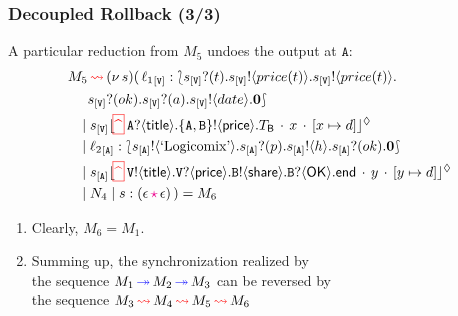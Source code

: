 \documentclass[12pt]{beamer}
\newcommand{\pS}{\ensuremath{\mathtt{V}}\xspace}
\newcommand{\epS}{\ep{s}{\mathtt{V}}}
\newcommand{\fwcolor}[1]{\textcolor{blue}{#1}}
\newcommand{\bkcolor}[1]{\textcolor{red}{#1}}
\newcommand{\sepcolor}[1]{\textcolor{magenta}{#1}}
\newcommand{\upd}[2]{[#1\mapsto #2]}
\newcommand{\sred}[1]{\textcolor{myred}{#1}}
\newcommand{\news}[1]{(\nu\, #1)}
\newcommand{\bi}{\begin{enumerate}[$\bullet$]}
\newcommand{\ei}{\end{enumerate}}
\newcommand{\queue}[1]{\lfloor #1 \rfloor}
\newcommand{\mysepp}{\,\cdot\,}
\newcommand{\codah}[4]{\coda{#1}{(#2\,\history\,#3)\!#4}}
\newcommand{\history}{\sepcolor{\mathbf{\star}}}
\newcommand{\coda}[2]{#1:#2}
\newcommand{\lend}{\mathsf{end}}
\newcommand{\gpart}[1]{\mathtt{#1}}
\newcommand{\hmoni}[4]{\ensuremath{{#1\queue{\textcolor{black}{#2}\mysepp #3\mysepp #4}^{\normark}}}}
\newcommand{\past}{\,\text{\textcolor{red}{\textbf{\textasciicircum}}}\,}
\newcommand{\mypast}{\,\sred{\framebox[3mm]{\past}\,}}
\newcommand{\conf}[2]{\lbag #2 \rbag} %
\newcommand{\ltout}[3]{\gpart{#1}!\langle#2\rangle.#3}
\newcommand{\ltinp}[3]{\gpart{#1}?\langle#2\rangle.#3}
\newcommand{\outses}{!}
\newcommand{\inpses}{?}
\newcommand{\Par}{\;|\;}
\newcommand{\emp}{\epsilon}
\newcommand{\freev}[1]{\langle #1\rangle}
\newcommand{\boundv}[1]{(#1)}
\newcommand{\shsep}{.}
\newcommand{\bout}[2]{#1 \outses \freev{#2} \shsep}
\newcommand{\binp}[2]{#1 \inpses \boundv{#2} \shsep}
\newcommand{\fw}{\ensuremath{\fwcolor{\,\twoheadrightarrow\,}}}
\newcommand{\bk}{\ensuremath{\bkcolor{\,\rightsquigarrow\,}}}
\newcommand{\key}[2]{#1_{[#2]}}
\newcommand{\np}[2]{#1:#2}
\newcommand{\ep}[2]{#1_{[#2]}}
\newcommand{\loc}{\ell}
\newcommand{\normark}{\lozenge}
\newcommand{\inact}{\mathbf{0}}
\newcommand{\epA}{\ep{s}{\mathtt{A}}}
\newcommand{\pA}{\ensuremath{\mathtt{A}}\xspace}
\newcommand{\exBook}{\text{`Logicomix'}}
\begin{document}
\begin{frame}
\frametitle{Decoupled Rollback (3/3)}
A particular reduction from $M_5$ undoes the output at \pA:
\begin{align*}
M_5 & \bk  \news{s}(\,  
\np{\key{{\loc_1}}{\pS}}{ \conf{\inact}{\binp{\epS}{t}\bout{\epS}{price(t)}\bout{\epS}{price(t)} \\ 
&   \binp{\epS}{ok}\binp{\epS}{a} \bout{\epS}{date}\inact }} 
\\
&  \!\!\!\! \Par 
 \hmoni{\ep{s}{\pS}}{\!\!\mypast \ltinp{A}{\mathsf{title}}{\ltout{\{A,B\}}{\mathsf{price}}{T_\mathsf{B}}}}{x}{\upd{x}{d}} 
\\
& \!\!\!\! \Par \np{\key{{\loc_2}}{\pA}}{ \conf{\inact}{\bout{\epA}{\exBook}\binp{\epA}{p}\bout{\epA}{h}\binp{\epA}{ok}\inact}} 
\\
& \!\!\!\!\Par 
\hmoni{\ep{s}{\pA}}{\!\!\mypast \ltout{\pS}{\mathsf{title}}{\ltinp{\pS}{\mathsf{price}}{\ltout{B}{\mathsf{share}}{\ltinp{B}{\mathsf{OK}}{\lend}}}}}{y}{\upd{y}{d}} 
\\
& \!\!\!\! \Par N_4 \Par \codah{s}{\emp}{\emp}{}~)  = M_6
\end{align*}

\bi
\item Clearly, $M_6 = M_1$.
\item Summing up, the synchronization realized by \\ the   sequence
$M_1 \fw M_2 \fw M_3$ can be reversed by \\ the    sequence
$M_3 \bk M_4 \bk M_5 \bk M_6$
\ei
\end{frame}
\end{document}
